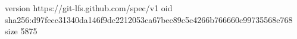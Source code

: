 version https://git-lfs.github.com/spec/v1
oid sha256:d97fecc31340da146f9dc2212053ca67bec89c5c4266b766660c99735568e768
size 5875
